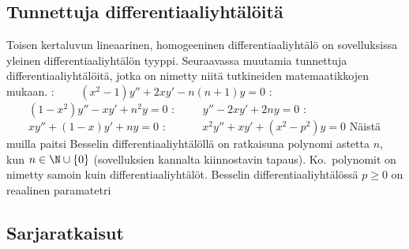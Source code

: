 \subsection{Tunnettuja differentiaaliyhtälöitä}

Toisen kertaluvun lineaarinen, homogeeninen differentiaaliyhtälö on sovelluksissa yleinen
differentiaaliyhtälön tyyppi. Seuraavassa muutamia tunnettuja differentiaaliyhtälöitä, jotka on
nimetty niitä tutkineiden matemaatikkojen mukaan.
%
\vspace{3mm}\newline
{}: $\qquad(x^2-1)y''+2xy'-n(n+1)y=0$ \vspace{3mm}\newline
{}: $\qquad (1-x^2)y''-xy'+n^2y=0$ \vspace{3mm}\newline
{}: $\qquad\ y''-2xy'+2ny=0$ \vspace{3mm}\newline
{}: $\qquad xy''+(1-x)y'+ny=0$ \vspace{3mm}\newline
{}: $\quad\qquad x^2y''+xy'+(x^2-p^2)y=0$ \vspace{3mm}\newline
Näistä muilla paitsi Besselin differentiaaliyhtälöllä on ratkaisuna polynomi astetta $n$, kun
$n\in\N\cup\{0\}$ (sovelluksien kannalta kiinnostavin tapaus). Ko.\ polynomit on nimetty
samoin kuin differentiaaliyhtälöt. Besselin differentiaaliyhtälössä $p \ge 0$ on reaalinen
paramatetri

\subsection{Sarjaratkaisut}

